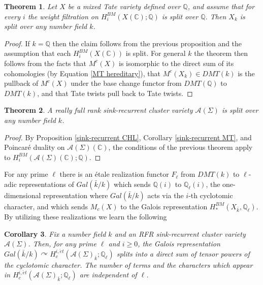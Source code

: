 \documentclass[11pt]{amsart}
\newtheorem{thm}{Theorem}[section]
\newtheorem{cor}[thm]{Corollary}
\theoremstyle{definition}
\theoremstyle{remark}
\numberwithin{equation}{section}
\begin{document}
\begin{thm}
    Let $X$ be a mixed Tate variety defined over $\mathbb{Q}$, and assume that for every $i$ the weight filtration on $H_i^{BM}(X(\mathbb{C}); \mathbb{Q})$ is split over $\mathbb{Q}$. Then $X_k$ is split over any number field $k$.
\end{thm}

\begin{proof}
If $k = \mathbb{Q}$ then the claim follows from the previous proposition and the assumption that each $H_i^{BM}(X(\mathbb{C}))$ is split. For general $k$ the theorem then follows from the facts that $M^c(X)$ is isomorphic to the direct sum of its cohomologies (by Equation \ref{MT hereditary}), that $M^c(X_k) \in DMT(k)$ is the pullback of $M^c(X)$ under the base change functor from $DMT(\mathbb{Q})$ to $DMT(k)$, and that Tate twists pull back to Tate twists.
\end{proof}

\begin{thm}\label{sink-recurrent split}
    A really full rank sink-recurrent cluster variety $\mathcal{A}(\Sigma)$ is split over any number field $k$.
\end{thm}

\begin{proof}
    By Proposition \ref{sink-recurrent CHL}, Corollary \ref{sink-recurrent MT}, and Poincar\'e duality on $\mathcal{A}(\Sigma)(\mathbb{C})$, the conditions of the previous theorem apply to $H_i^{BM}(\mathcal{A}(\Sigma)(\mathbb{C});\mathbb{Q})$.
\end{proof}

For any prime $\ell$ there is an \'etale realization functor $F_\ell$ from $DMT(k)$ to $\ell$-adic representations of $Gal(\bar{k}/k)$ which sends $\mathbb{Q}(i)$ to $\mathbb{Q}_\ell(i)$, the one-dimensional representation where $Gal(\bar{k}/k)$ acts via the $i$-th cyclotomic character, and which sends $M_c(X)$ to the Galois representation $H_*^{BM}(X_{\bar{k}}, \mathbb{Q}_\ell)$. By utilizing these realizations we learn the following

\begin{cor}
    Fix a number field $k$ and an RFR sink-recurrent cluster variety $\mathcal{A}(\Sigma)$. Then, for any prime $\ell$ and $i \geq 0$, the Galois representation $Gal(\bar{k}/k) \curvearrowright H_c^{i, \acute{e}t}(\mathcal{A}(\Sigma)_{\overline{k}}; \mathbb{Q}_\ell)$ splits into a direct sum of tensor powers of the cyclotomic character. The number of terms and the characters which appear in $H_c^{i, \acute{e}t}(\mathcal{A}(\Sigma)_{\bar{k}}; \mathbb{Q}_\ell)$ are independent of $\ell$.
\end{cor}
\end{document}
